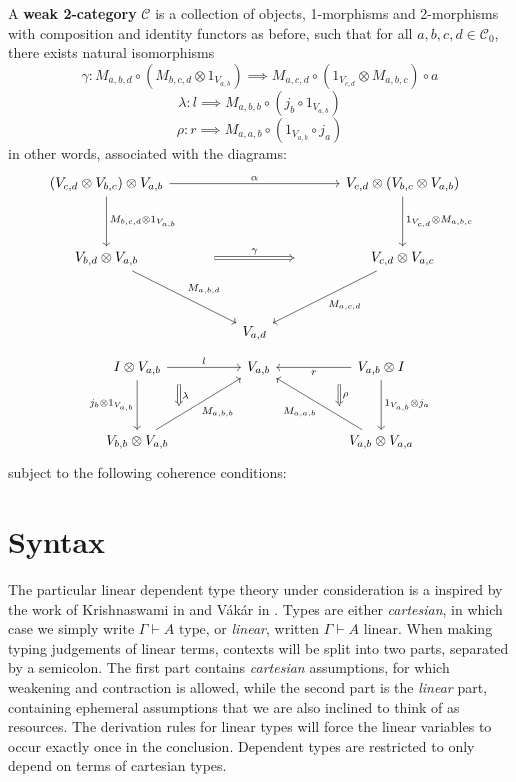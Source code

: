\begin{defn}
  A \textbf{weak 2-category} $\mathcal{C}$ is a collection of objects, 1-morphisms and 2-morphisms with composition and identity functors as before, such that for all $a, b, c, d \in \mathcal{C}_0$, there exists natural isomorphisms
  \[
    \gamma :  M_{a,b,d} \circ (M_{b,c,d} \otimes 1_{V_{a,b}}) \implies M_{a, c, d} \circ (1_{V_{c, d}} \otimes M_{a, b, c}) \circ a
  \]
  \[
    \lambda : l \implies M_{a, b, b} \circ (j_b \circ 1_{V_{a,b}})
  \]
  \[
    \rho : r \implies M_{a, a, b} \circ (1_{V_{a,b}} \circ j_a)
  \]
  in other words, associated with the diagrams:
  \[
    \ti
    (V_{c, d} \otimes V_{b, c}) \otimes V_{a, b} \ar[d, "{M_{b, c, d} \otimes 1_{V_{a,b}}}"] \ar[rr, "\alpha"] & & V_{c, d} \otimes (V_{b, c} \otimes V_{a, b}) \ar[d, "{1_{V_{c,d}} \otimes M_{a, b, c}}"]\\
    V_{b, d} \otimes V_{a, b} \ar[rd, "M_{a, b, d}"] \ar[rr, "\gamma", Rightarrow, shorten <=50pt,shorten >=50pt]& & V_{c, d} \otimes V_{a, c} \ar[ld, "M_{a, c, d}"]\\
    & V_{a, d}      &
    \kz
  \]
  \[
    \ti
    I \otimes V_{a, b} \ar[d, "j_b \otimes 1_{V_{a, b}}", swap] \ar[d, "\lambda", Rightarrow, xshift=30pt, shorten <=10pt,shorten >=10pt, yshift=7pt] \ar[r, "l"] & V_{a, b} & V_{a, b} \otimes I \ar[l, "r"] \ar[d, "1_{V_{a, b}} \otimes j_a"] \ar[d, "\rho", Rightarrow, xshift=-30pt, shorten <=10pt,shorten >=10pt, yshift=7pt] \\
    V_{b, b} \otimes V_{a, b} \ar[ru, "M_{a, b, b}",swap] & & V_{a, b} \otimes V_{a, a} \ar[lu, "M_{a, a, b}"]
    \kz
  \]
  subject to the following coherence conditions:
\end{defn}


%
\section{Syntax}
The particular linear dependent type theory under consideration is a inspired by the work of Krishnaswami in \cite{krishnaswami} and Vákár in \cite{vakar14}. Types are either \textit{cartesian}, in which case we simply write $\Gamma \vdash A \text{ type}$, or \textit{linear}, written $\Gamma \vdash A \text{ linear}$. When making typing judgements of linear terms, contexts will be split into two parts, separated by a semicolon. The first part contains \textit{cartesian} assumptions, for which weakening and contraction is allowed, while the second part is the \textit{linear} part, containing ephemeral assumptions that we are also inclined to think of as resources. The derivation rules for linear types will force the linear variables to occur exactly once in the conclusion. Dependent types are restricted to only depend on terms of cartesian types. 
